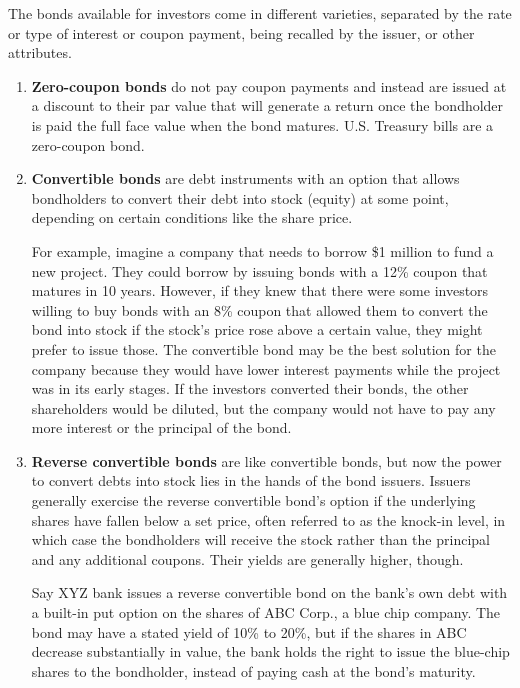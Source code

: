 \documentclass{article}
\begin{document}
  \begin{definition}
    The bonds available for investors come in different varieties, separated by the rate or type of interest or coupon payment, being recalled by the issuer, or other attributes. 
    \begin{enumerate}
      \item \textbf{Zero-coupon bonds} do not pay coupon payments and instead are issued at a discount to their par value that will generate a return once the bondholder is paid the full face value when the bond matures. U.S. Treasury bills are a zero-coupon bond. 
      \item \textbf{Convertible bonds} are debt instruments with an option that allows bondholders to convert their debt into stock (equity) at some point, depending on certain conditions like the share price. 
      
      For example, imagine a company that needs to borrow \$1 million to fund a new project. They could borrow by issuing bonds with a 12\% coupon that matures in 10 years. However, if they knew that there were some investors willing to buy bonds with an 8\% coupon that allowed them to convert the bond into stock if the stock’s price rose above a certain value, they might prefer to issue those. The convertible bond may be the best solution for the company because they would have lower interest payments while the project was in its early stages. If the investors converted their bonds, the other shareholders would be diluted, but the company would not have to pay any more interest or the principal of the bond. 
      
      \item \textbf{Reverse convertible bonds} are like convertible bonds, but now the power to convert debts into stock lies in the hands of the bond issuers. Issuers generally exercise the reverse convertible bond's option if the underlying shares have fallen below a set price, often referred to as the knock-in level, in which case the bondholders will receive the stock rather than the principal and any additional coupons. Their yields are generally higher, though. 
      
      Say XYZ bank issues a reverse convertible bond on the bank's own debt with a built-in put option on the shares of ABC Corp., a blue chip company. The bond may have a stated yield of 10\% to 20\%, but if the shares in ABC decrease substantially in value, the bank holds the right to issue the blue-chip shares to the bondholder, instead of paying cash at the bond's maturity.
      

\end{enumerate}
\end{definition}
\end{document}

